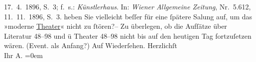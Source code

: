 \begin{ledgroupsized}[t]{13cm}
{{{{                           17. 4. 1896, S. 3; f. s.: \emph{Künstlerhaus}. In: \emph{Wiener Allgemeine Zeitung}, Nr. 5.612, 11. 11. 1896,
                        S. 3. }}}\label{K_L02972-12h}} heben Sie vielleicht {\pb}beſſer für eine
               ſpätere Sa{\geminationm}lung auf, um das »moderne \uline{Theater}« nicht zu ſtören?– \pend
           \pstart
           Zu überlegen, ob die Aufſätze über Literatur 48–98 und ü Theater 48–98 nicht bis auf
               den heutigen Tag fortzuſetzen wären. (Event. als Anfang?) \pend
           \pstart
           Auf Wiederſehen. Herzlichſt {\\[\baselineskip]}Ihr \spacefill\mbox{A.}\pend
           \leftskip=0em{}
         
         \endnumbering{}\end{ledgroupsized}\begin{anhang}\end{anhang}\newcommand{\dateiname}{L02972}\newcommand{\titel}{Arthur Schnitzler an Felix Salten, 25. 3. [1902]}\newcommand{\editorInnen}{Martin Anton Müller und Laura Untner}
      